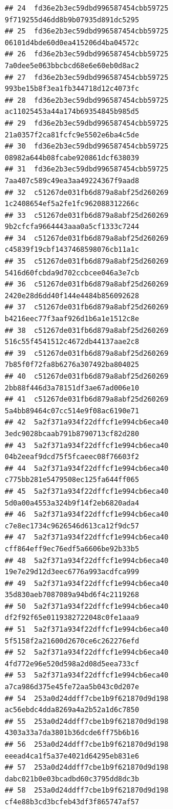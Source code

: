 \documentclass[]{article}
\begin{document}
\begin{verbatim}
## 24  fd36e2b3ec59dbd996587454cbb59725   9f719255d46dd8b9b07935d891dc5295
## 25  fd36e2b3ec59dbd996587454cbb59725   06101d4bde60d0ea415206d4ba04572c
## 26  fd36e2b3ec59dbd996587454cbb59725   7a0dee5e063bbcbcd68e6e60eb0d8ac2
## 27  fd36e2b3ec59dbd996587454cbb59725   993be15b8f3ea1fb344718d12c4073fc
## 28  fd36e2b3ec59dbd996587454cbb59725   ac11025453a44a174b69354845b985d5
## 29  fd36e2b3ec59dbd996587454cbb59725   21a0357f2ca81fcfc9e5502e6ba4c5de
## 30  fd36e2b3ec59dbd996587454cbb59725   08982a644b08fcabe920861dcf638039
## 31  fd36e2b3ec59dbd996587454cbb59725   7aa407c589c49ea3aa49224367f9aad8
## 32  c51267de031fb6d879a8abf25d260269   1c2408654ef5a2fe1fc962088312266c
## 33  c51267de031fb6d879a8abf25d260269   9b2cfcfa9664443aaa0a5cf1333c7244
## 34  c51267de031fb6d879a8abf25d260269   c45839f19cbf1437468598076cb11a1c
## 35  c51267de031fb6d879a8abf25d260269   5416d60fcbda9d702ccbcee046a3e7cb
## 36  c51267de031fb6d879a8abf25d260269   2420e28d6dd40f144e4484b856092628
## 37  c51267de031fb6d879a8abf25d260269   b4216eec77f3aaf926d1b6a1e1512c8e
## 38  c51267de031fb6d879a8abf25d260269   516c55f4541512c4672db44137aae2c8
## 39  c51267de031fb6d879a8abf25d260269   7b85f0f72fa8b6276a307492ba804025
## 40  c51267de031fb6d879a8abf25d260269   2bb88f446d3a78151df3ae67ad006e10
## 41  c51267de031fb6d879a8abf25d260269   5a4bb89464c07cc514e9f08ac6190e71
## 42  5a2f371a934f22dffcf1e994cb6eca40   3edc9028bcaab791b8790713cf82d280
## 43  5a2f371a934f22dffcf1e994cb6eca40   04b2eeaf9dcd75f5fcaeec08f76603f2
## 44  5a2f371a934f22dffcf1e994cb6eca40   c775bb281e5479508ec125fa644ff065
## 45  5a2f371a934f22dffcf1e994cb6eca40   5d0a00a4553a324b9f14f2eb6820ada4
## 46  5a2f371a934f22dffcf1e994cb6eca40   c7e8ec1734c9626546d613ca12f9dc57
## 47  5a2f371a934f22dffcf1e994cb6eca40   cff864eff9ec76edf5a6606be92b33b5
## 48  5a2f371a934f22dffcf1e994cb6eca40   19e7e29d12d3eec6776a993acdfca999
## 49  5a2f371a934f22dffcf1e994cb6eca40   35d830aeb7087089a94bd6f4c2119268
## 50  5a2f371a934f22dffcf1e994cb6eca40   df2f92f65e0119382722048c0fe1aaa9
## 51  5a2f371a934f22dffcf1e994cb6eca40   5f5158f2a21600d2670ce6c262276efd
## 52  5a2f371a934f22dffcf1e994cb6eca40   4fd772e96e520d598a2d08d5eea733cf
## 53  5a2f371a934f22dffcf1e994cb6eca40   a7ca986d375e45fe72aa5b043c0d207e
## 54  253a0d24ddff7cbe1b9f621870d9d198   ac56ebdc4dda8269a4a2b52a1d6c7850
## 55  253a0d24ddff7cbe1b9f621870d9d198   4303a33a7da3801b36dcde6ff75b6b16
## 56  253a0d24ddff7cbe1b9f621870d9d198   eeead4ca1f5a37e4021d64295eb831e6
## 57  253a0d24ddff7cbe1b9f621870d9d198   dabc021b0e03bcadbd60c3795dd8dc3b
## 58  253a0d24ddff7cbe1b9f621870d9d198   cf4e88b3cd3bcfeb43df3f865747af57

\end{verbatim}
\end{document}
